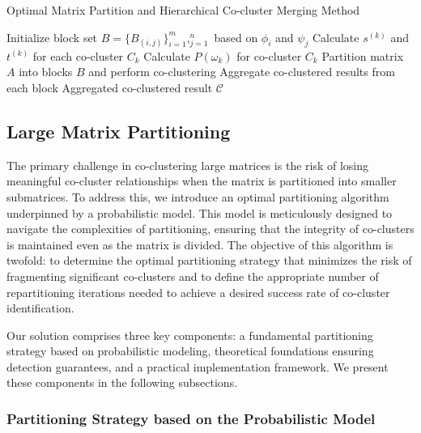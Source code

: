 \documentclass[journal]{IEEEtran}
\begin{document}
\begin{algorithm}[!t]
    \caption{Optimal Matrix Partition and Hierarchical Co-cluster Merging Method}\label{alg:method}
    \begin{algorithmic}[1]
        \STATE Initialize block set $B = \{B_{(i,j)}\}_{i=1}^m,_{j=1}^n$ based on $\phi_i$ and $\psi_j$
        \STATE Calculate $s^{(k)}$ and $t^{(k)}$ for each co-cluster $C_k$
        \STATE Calculate $P(\omega_k)$ for co-cluster $C_k$
        \STATE Partition matrix $A$ into blocks $B$ and perform co-clustering
        \STATE Aggregate co-clustered results from each block
        \ENDIF
        \ENDFOR
        \RETURN Aggregated co-clustered result $\mathcal{C}$
    \end{algorithmic}
\end{algorithm}


\subsection{Large Matrix Partitioning}
\label{subsec:large_matrix_partitioning}
The primary challenge in co-clustering large matrices is the risk of losing meaningful co-cluster relationships when the matrix is partitioned into smaller submatrices. To address this, we introduce an optimal partitioning algorithm underpinned by a probabilistic model. This model is meticulously designed to navigate the complexities of partitioning, ensuring that the integrity of co-clusters is maintained even as the matrix is divided. The objective of this algorithm is twofold: to determine the optimal partitioning strategy that minimizes the risk of fragmenting significant co-clusters and to define the appropriate number of repartitioning iterations needed to achieve a desired success rate of co-cluster identification.

Our solution comprises three key components: a fundamental partitioning strategy based on probabilistic modeling, theoretical foundations ensuring detection guarantees, and a practical implementation framework. We present these components in the following subsections.

\subsubsection{Partitioning Strategy based on the Probabilistic Model}
\end{document}
